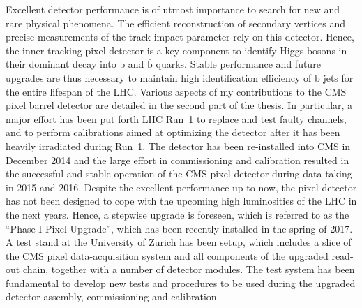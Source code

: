 \noindent Excellent detector performance is of utmost importance to search for new and rare physical phenomena.
The efficient reconstruction of secondary vertices and precise measurements of the track impact parameter rely on this detector.
Hence, the inner tracking pixel detector is a key component to identify Higgs bosons in their dominant decay into b and $\bar{\mathrm{b}}$ quarks.
Stable performance and future upgrades are thus necessary to maintain high identification efficiency of b jets for the entire lifespan of the LHC.
Various aspects of my contributions to the CMS pixel barrel detector are detailed in the second part of the thesis.
In particular, a major effort has been put forth LHC Run~1 to replace and test faulty channels,
and to perform calibrations aimed at optimizing the detector after it has been heavily irradiated during Run~1.
The detector has been re-installed into CMS in December 2014 and the large effort in commissioning and calibration 
resulted in the successful and stable operation of the CMS pixel detector during data-taking in 2015 and 2016.
Despite the excellent performance up to now, the pixel detector has not been designed to cope with the upcoming high luminosities of the LHC in the next years.
Hence, a stepwise upgrade is foreseen, which is referred to as the ``Phase I Pixel Upgrade'', which has been recently installed in the spring of 2017.
A test stand at the University of Zurich has been setup, which includes a slice of the CMS pixel data-acquisition system and all components of the upgraded read-out chain, together with a number of detector modules.
The test system has been fundamental to develop new tests and procedures to be used during the upgraded detector assembly, commissioning and calibration.

\vspace*{\fill}
